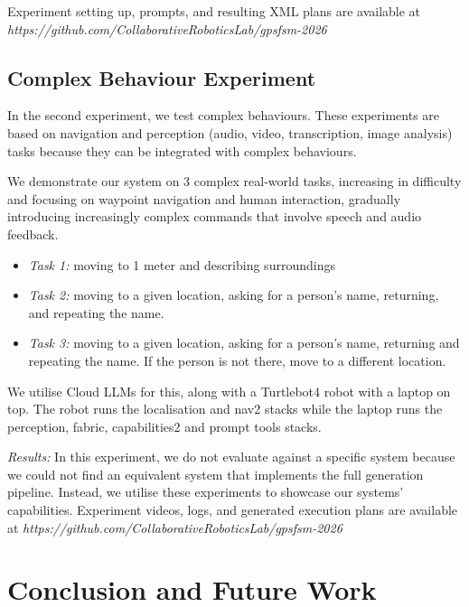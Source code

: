 \documentclass[letterpaper, 10pt, conference]{ieeeconf}      %
\begin{document}
Experiment setting up, prompts, and resulting XML plans are available at \textit{https://github.com/CollaborativeRoboticsLab/gpsfsm-2026}

\subsection{Complex Behaviour Experiment}

In the second experiment, we test complex behaviours. These experiments are based on navigation and perception (audio, video, transcription, image analysis) tasks because they can be integrated with complex behaviours.

We demonstrate our system on 3 complex real-world tasks, increasing in difficulty and focusing on waypoint navigation and human interaction, gradually introducing increasingly complex commands that involve speech and audio feedback.

\begin{itemize}
    \item \textit{Task 1:} moving to 1 meter and describing surroundings
    \item \textit{Task 2:} moving to a given location, asking for a person's name, returning, and repeating the name.
    \item \textit{Task 3:} moving to a given location, asking for a person's name, returning and repeating the name. If the person is not there, move to a different location.
\end{itemize}

We utilise Cloud LLMs for this, along with a Turtlebot4 robot with a laptop on top. The robot runs the localisation and nav2 stacks while the laptop runs the perception, fabric, capabilities2 and prompt tools stacks.

\textit{Results:} In this experiment, we do not evaluate against a specific system because we could not find an equivalent system that implements the full generation pipeline. Instead, we utilise these experiments to showcase our systems' capabilities. Experiment videos, logs, and generated execution plans are available at \textit{https://github.com/CollaborativeRoboticsLab/gpsfsm-2026}


\section{Conclusion and Future Work}
\end{document}
